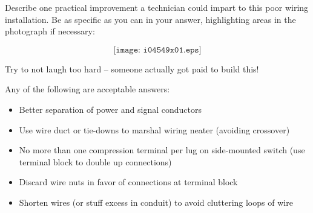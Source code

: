 

Describe one practical improvement a technician could impart to this poor wiring installation.  Be as specific as you can in your answer, highlighting areas in the photograph if necessary:

$$\texttt{[image: i04549x01.eps]}$$

Try to not laugh too hard -- someone actually got paid to build this!







Any of the following are acceptable answers:

\begin{itemize}
\item{} Better separation of power and signal conductors
\item{} Use wire duct or tie-downs to marshal wiring neater (avoiding crossover)
\item{} No more than one compression terminal per lug on side-mounted switch (use terminal block to double up connections)
\item{} Discard wire nuts in favor of connections at terminal block
\item{} Shorten wires (or stuff excess in conduit) to avoid cluttering loops of wire
\end{itemize}










